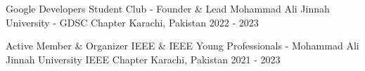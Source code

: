 
\begin{cventries}

  \cventry
    {Google Developers Student Club - Founder \& Lead} %
    {Mohammad Ali Jinnah University - GDSC Chapter} %
    {Karachi, Pakistan} %
    {2022 - 2023} %
    {
    }

  \cventry
    {Active Member \& Organizer} %
    {IEEE \& IEEE Young Professionals - Mohammad Ali Jinnah University IEEE Chapter} %
    {Karachi, Pakistan} %
    {\vspace{-0.5em} 2021 - 2023} %
    {
    }


\end{cventries}
